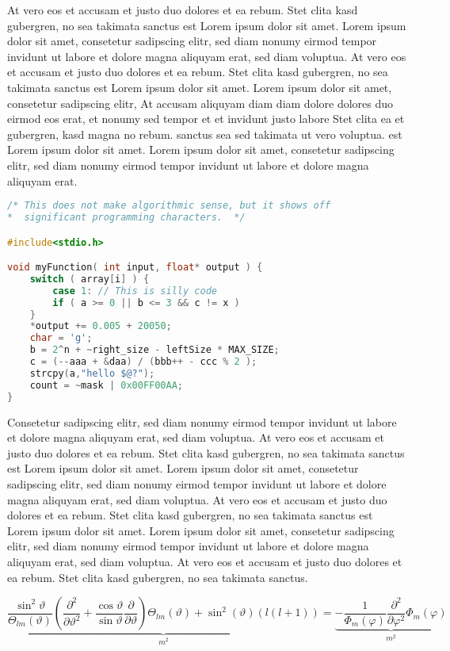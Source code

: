 \documentclass[ %
	DIV=15,
	BCOR=14mm, %
	parskip=half, %
	headsepline, %
	cleardoublepage=empty, %
	tablecaptionabove, %
	toc=bib, %
	toc=listofnumbered, %
	listof=leveldown, %
	numbers=noendperiod %
	]{scrbook}
\begin{document}
At vero eos et accusam et justo duo dolores et ea rebum. Stet clita kasd gubergren, no sea takimata sanctus est Lorem ipsum dolor sit amet. Lorem ipsum dolor sit amet, consetetur sadipscing elitr, sed diam nonumy eirmod tempor invidunt ut labore et dolore magna aliquyam erat, sed diam voluptua. At vero eos et accusam et justo duo dolores et ea rebum. Stet clita kasd gubergren, no sea takimata sanctus est Lorem ipsum dolor sit amet. Lorem ipsum dolor sit amet, consetetur sadipscing elitr, At accusam aliquyam diam diam dolore dolores duo eirmod eos erat, et nonumy sed tempor et et invidunt justo labore Stet clita ea et gubergren, kasd magna no rebum. sanctus sea sed takimata ut vero voluptua. est Lorem ipsum dolor sit amet. Lorem ipsum dolor sit amet, consetetur sadipscing elitr, sed diam nonumy eirmod tempor invidunt ut labore et dolore magna aliquyam erat.

\begin{lstlisting}[language=C]
/* This does not make algorithmic sense, but it shows off
*  significant programming characters.  */

#include<stdio.h>

void myFunction( int input, float* output ) {
	switch ( array[i] ) {
		case 1: // This is silly code
		if ( a >= 0 || b <= 3 && c != x )
	}
	*output += 0.005 + 20050;
	char = 'g';
	b = 2^n + ~right_size - leftSize * MAX_SIZE;
	c = (--aaa + &daa) / (bbb++ - ccc % 2 );
	strcpy(a,"hello $@?");
	count = ~mask | 0x00FF00AA;
}
\end{lstlisting}

Consetetur sadipscing elitr, sed diam nonumy eirmod tempor invidunt ut labore et dolore magna aliquyam erat, sed diam voluptua. At vero eos et accusam et justo duo dolores et ea rebum. Stet clita kasd gubergren, no sea takimata sanctus est Lorem ipsum dolor sit amet. Lorem ipsum dolor sit amet, consetetur sadipscing elitr, sed diam nonumy eirmod tempor invidunt ut labore et dolore magna aliquyam erat, sed diam voluptua. At vero eos et accusam et justo duo dolores et ea rebum. Stet clita kasd gubergren, no sea takimata sanctus est Lorem ipsum dolor sit amet. Lorem ipsum dolor sit amet, consetetur sadipscing elitr, sed diam nonumy eirmod tempor invidunt ut labore et dolore magna aliquyam erat, sed diam voluptua. At vero eos et accusam et justo duo dolores et ea rebum. Stet clita kasd gubergren, no sea takimata sanctus.

\begin{equation}
	\underbrace{\frac{\sin^{2}\vartheta}{\Theta_{lm}(\vartheta)}\left(\frac{\partial^{2}}{\partial\vartheta^{2}}+\frac{\cos\vartheta}{\sin\vartheta}\frac{\partial}{\partial\vartheta}\right)\Theta_{lm}(\vartheta)+\sin^{2}(\vartheta)(l(l+1))}_{m^{2}}=\underbrace{-\frac{1}{\Phi_{m}(\varphi)}\frac{\partial^{2}}{\partial\varphi^{2}}\Phi_{m}(\varphi)}_{m^{2}}
\end{equation}
\end{document}
